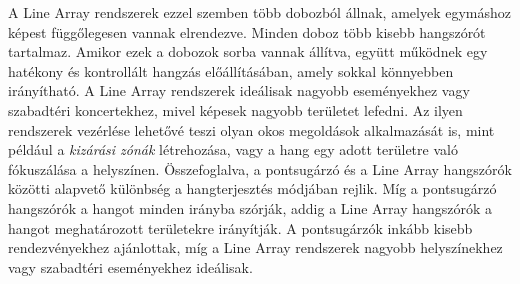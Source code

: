 A Line Array rendszerek ezzel szemben több dobozból állnak, amelyek egymáshoz képest függőlegesen vannak elrendezve.
Minden doboz több kisebb hangszórót tartalmaz. Amikor ezek a dobozok sorba vannak állítva, 
együtt működnek egy hatékony és kontrollált hangzás előállításában, amely sokkal könnyebben irányítható. 
A Line Array rendszerek ideálisak nagyobb eseményekhez vagy szabadtéri koncertekhez, mivel képesek 
nagyobb területet lefedni. Az ilyen rendszerek vezérlése lehetővé 
teszi olyan okos megoldások alkalmazását is, mint például a \textit{kizárási zónák} létrehozása, vagy a 
hang egy adott területre való fókuszálása a helyszínen.
Összefoglalva, a pontsugárzó és a Line Array hangszórók közötti alapvető különbség a hangterjesztés módjában rejlik. 
Míg a pontsugárzó hangszórók a hangot minden irányba szórják, addig a Line Array hangszórók a hangot meghatározott területekre irányítják. 
A pontsugárzók inkább kisebb rendezvényekhez ajánlottak, míg a Line Array rendszerek nagyobb helyszínekhez vagy szabadtéri eseményekhez ideálisak.
